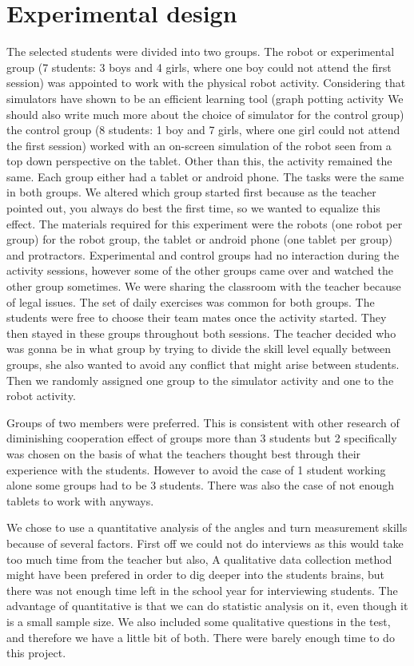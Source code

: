\chapter{Experimental design}
The selected students were divided into two groups. The robot or experimental group (7 students: 3 boys and 4 girls, where one boy could not attend the first session) was appointed to work with the physical robot activity. Considering that simulators have shown to be an efficient learning tool (graph potting activity We should also write much more about the choice of simulator for the control group) the control group (8 students: 1 boy and 7 girls, where one girl could not attend the first session) worked with an on-screen simulation of the robot seen from a top down perspective on the tablet. Other than this, the activity remained the same. Each group either had a tablet or android phone. The tasks were the same in both groups. We altered which group started first because as the teacher pointed out, you always do best the first time, so we wanted to equalize this effect. The materials required for this experiment were the robots (one robot per group) for the robot group, the tablet or android phone (one tablet per group) and protractors. Experimental and control groups had no interaction during the activity sessions, however some of the other groups came over and watched the other group sometimes. We were sharing the classroom with the teacher because of legal issues. The set of daily exercises was common for both groups. The students were free to choose their team mates once the activity started. They then stayed in these groups throughout both sessions. The teacher decided who was gonna be in what group by trying to divide the skill level equally between groups, she also wanted to avoid any conflict that might arise between students. Then we randomly assigned one group to the simulator activity and one to the robot activity. 

Groups of two members were preferred. This is consistent with other research of diminishing cooperation effect of groups more than 3 students but 2 specifically was chosen on the basis of what the teachers thought best through their experience with the students. However to avoid the case of 1 student working alone some groups had to be 3 students. There was also the case of not enough tablets to work with anyways.

We chose to use a quantitative analysis of the angles and turn measurement skills because of several factors. First off we could not do interviews as this would take too much time from the teacher but also, A qualitative data collection method might have been prefered in order to dig deeper into the students brains, but there was not enough time left in the school year for interviewing students. The advantage of quantitative is that we can do statistic analysis on it, even though it is a small sample size. We also included some qualitative questions in the test, and therefore we have a little bit of both. There were barely enough time to do this project. 
